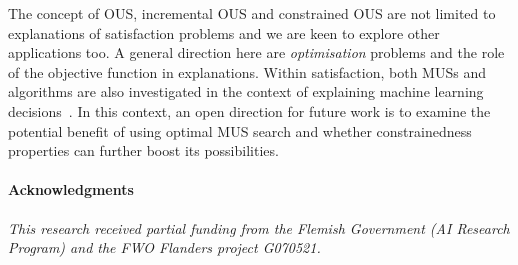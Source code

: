 The concept of OUS, incremental OUS and constrained OUS are not limited to explanations of satisfaction problems and we are keen to explore other applications too.
A general direction here are \textit{optimisation} problems and the role of the objective function in explanations.
Within satisfaction, both MUSs and \hitsetbased algorithms are also investigated in the context of explaining machine learning decisions~\cite{ignatiev2019abduction}. 
In this context, an open direction for future work is to examine the potential benefit of using optimal MUS search and whether constrainedness properties can further boost its possibilities.

\paragraph{Acknowledgments}
\textit{This research received partial funding from the Flemish Government (AI Research Program) and the FWO Flanders project G070521.}